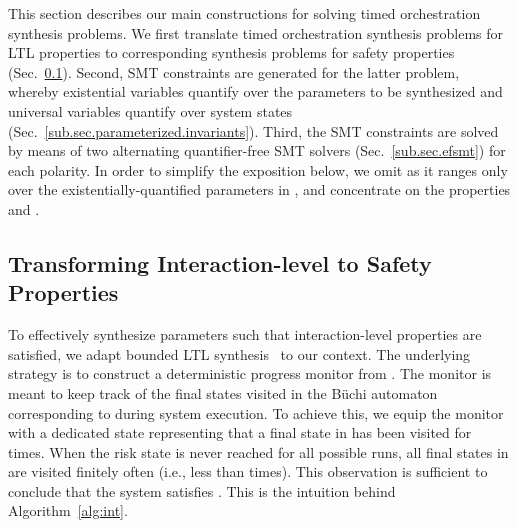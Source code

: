 
This section describes our main constructions for solving timed orchestration synthesis problems.
We first translate timed orchestration synthesis problems for LTL
properties to corresponding synthesis problems for safety properties
(Sec.~\ref{sub.sec.monitor})\@. Second,
SMT constraints are generated for the latter problem, whereby existential 
variables quantify over the parameters to be synthesized and universal variables quantify over system states
(Sec.~\ref{sub.sec.parameterized.invariants}). 
Third, the 
SMT constraints are solved by means of two alternating quantifier-free SMT solvers (Sec.~\ref{sub.sec.efsmt}) for each polarity\@.
In order to simplify the exposition below, we omit  as it ranges only over the existentially-quantified parameters  in , and 
concentrate on the properties  and \@. 



\subsection{Transforming Interaction-level to Safety Properties}\label{sub.sec.monitor}

To effectively synthesize parameters such that interaction-level
properties  are satisfied, we adapt bounded
LTL synthesis~\cite{ScheweF07a} to our context. The underlying
strategy is to construct a deterministic progress monitor from
.  The monitor is meant to keep track of the final states
visited in the B\"uchi automaton 
corresponding to  during system execution. To achieve
this, we equip the monitor with a dedicated  state
representing that a final state in  has
been visited for  times. When the risk state is never reached for
all possible runs, all final states in 
are visited finitely often (i.e., less than  times). This
observation is sufficient to conclude that the system satisfies
. This is the intuition behind Algorithm~\ref{alg:int}.

